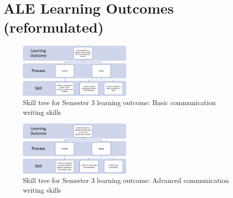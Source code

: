 \chapter{ALE Learning Outcomes (reformulated)}\label{appendices:learning_outcomes}

\begin{figure}[h]
    \centering
   \includegraphics[width=0.5\textwidth]{appendices/learning_outcomes/LO_S3.png}
    \caption{Skill tree for Semester 3 learning outcome: Basic communication writing skills}
    \label{fig:LO_S3}
\end{figure}

\begin{figure}[h]
    \centering
   \includegraphics[width=0.5\textwidth]{appendices/learning_outcomes/LO_S6.png}
    \caption{Skill tree for Semester 3 learning outcome: Advanced communication writing skills}
    \label{fig:LO_S6}
\end{figure}
